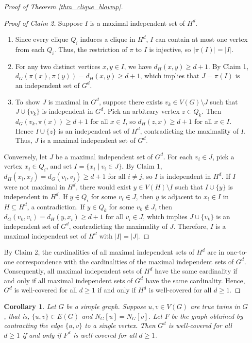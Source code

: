 \documentclass[10pt,a4paper]{amsart}
\numberwithin{equation}{section}
\newtheorem{cor}[thm]{\bf Corollary}
\theoremstyle{definition}
\begin{document}
\begin{proof}[Proof of Theorem \ref{thm_clique_blowup}]
\begin{proof}[Proof of Claim 2]
Suppose $I$ is a maximal independent set of $H^d$. 
\begin{enumerate}
    \item Since every clique $Q_i$ induces a clique in $H^d$, $I$ can contain at most one vertex from each $Q_i$. Thus, the restriction of $\pi$ to $I$ is injective, so $|\pi(I)| = |I|$.
    \item For any two distinct vertices $x, y \in I$, we have $d_H(x, y) \ge d+1$. By Claim 1, $d_G(\pi(x), \pi(y)) = d_H(x,y) \ge d+1$, which implies that $J = \pi(I)$ is an independent set of $G^d$.
    \item To show $J$ is maximal in $G^d$, suppose there exists $v_k \in V(G) \setminus J$ such that $J \cup \{v_k\}$ is independent in $G^d$. Pick an arbitrary vertex $z \in Q_k$. Then $d_G(v_k, \pi(x)) \ge d+1$ for all $x \in I$, so $d_H(z, x) \ge d+1$ for all $x \in I$. Hence $I \cup \{z\}$ is an independent set of $H^d$, contradicting the maximality of $I$. Thus, $J$ is a maximal independent set of $G^d$.
\end{enumerate}

Conversely, let $J$ be a maximal independent set of $G^d$. For each $v_i \in J$, pick a vertex $x_i \in Q_i$, and set $I = \{x_i \mid v_i \in J\}$. By Claim 1, $d_H(x_i, x_j) = d_G(v_i, v_j) \ge d+1$ for all $i \neq j$, so $I$ is independent in $H^d$. If $I$ were not maximal in $H^d$, there would exist $y \in V(H) \setminus I$ such that $I \cup \{y\}$ is independent in $H^d$. If $y \in Q_i$ for some $v_i \in J$, then $y$ is adjacent to $x_i \in I$ in $H \subseteq H^d$, a contradiction. If $y \in Q_k$ for some $v_k \notin J$, then $d_G(v_k, v_i) = d_H(y, x_i) \ge d+1$ for all $v_i \in J$, which implies $J \cup \{v_k\}$ is an independent set of $G^d$, contradicting the maximality of $J$. Therefore, $I$ is a maximal independent set of $H^d$ with $|I| = |J|$.
\end{proof}

By Claim 2, the cardinalities of all maximal independent sets of $H^d$ are in one-to-one correspondence with the cardinalities of the maximal independent sets of $G^d$. Consequently, all maximal independent sets of $H^d$ have the same cardinality if and only if all maximal independent sets of $G^d$ have the same cardinality. Hence, $G^d$ is well-covered for all $d \ge 1$ if and only if $H^d$ is well-covered for all $d \ge 1$.
\end{proof}

\begin{cor}\label{cor_twins}
Let $G$ be a simple graph. Suppose $u, v \in V(G)$ are true twins in $G$, that is, $\{u,v\} \in E(G)$ and $N_G[u] = N_G[v]$. Let $F$ be the graph obtained by contracting the edge $\{u,v\}$ to a single vertex. Then $G^d$ is well-covered for all $d \ge 1$ if and only if $F^d$ is well-covered for all $d \ge 1$.
\end{cor}
\end{document}
